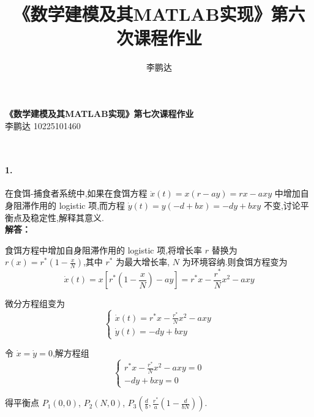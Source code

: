 \documentclass{article}
\begin{document}
\newcommand{\titem}[1]{
~\\
\begin{itemize}
    \item \heiti \large {#1}
\end{itemize}
}

\newcommand{\bb}[1]{{\heiti {#1}}}

\renewcommand{\d}{\mathrm{d}}

\newcommand{\cf}[1]{$^{#1}\textrm{C}$}

\title{《数学建模及其MATLAB实现》第六次课程作业}
\author{李鹏达}
    

\begin{center}
    \LARGE \textbf{\heiti 《数学建模及其{\timesfont MATLAB}实现》第七次课程作业} \\[0.5em]
    \large 李鹏达 10225101460
\end{center}

~\\

\paragraph{1.}在食饵-捕食者系统中,如果在食饵方程
    \(
    \dot{x}(t) = x \left( r - ay \right) = rx - axy
    \)
    中增加自身阻滞作用的 logistic 项,而方程
    \(
    \dot{y}(t) = y \left( -d + bx \right) = -dy + bxy
    \)
    不变,讨论平衡点及稳定性,解释其意义.\\

\noindent\textbf{{\heiti 解答：}}

    食饵方程中增加自身阻滞作用的 logistic 项,将增长率 $r$ 替换为 $r(x) = r^* \left(1- \frac{x}{N} \right)$,其中 $r^*$ 为最大增长率, $N$ 为环境容纳.则食饵方程变为
    \[
    \dot{x}(t) = x \left[ r^* \left( 1 - \frac{x}{N} \right) - ay \right] = r^* x - \frac{r^*}{N} x^2 - axy
    \]

    微分方程组变为
    \[
    \begin{cases}
        \dot{x}(t) = r^* x - \frac{r^*}{N} x^2 - axy \\
        \dot{y}(t) = -dy + bxy
    \end{cases}
    \]

    令 $\dot{x} = \dot{y} = 0$,解方程组
    \[
    \begin{cases}
        r^* x - \frac{r^*}{N} x^2 - axy = 0 \\
        -dy + bxy = 0
    \end{cases}
    \]

    得平衡点 $P_1(0,0)$, $P_2(N, 0)$, $P_3(\frac{d}{b}, \frac{r^*}{a}(1- \frac{d}{bN}))$.
\end{document}
